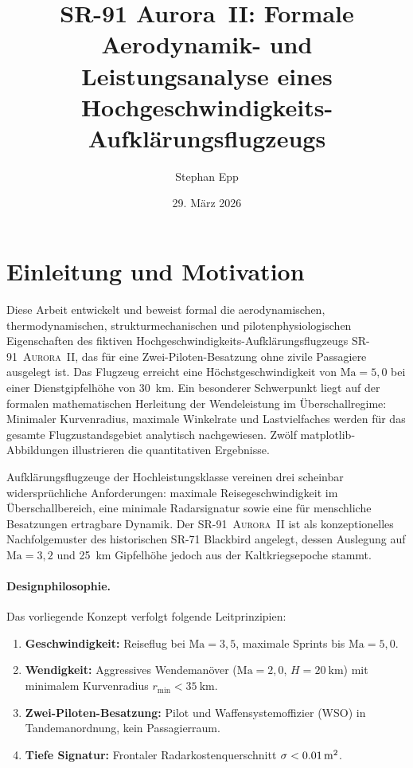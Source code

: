 ﻿\documentclass[12pt,a4paper]{article}
\title{\textbf{SR-91 Aurora~II:	Formale Aerodynamik- und Leistungsanalyse
	eines Hochgeschwindigkeits-Aufklärungsflugzeugs}}
\author{Stephan Epp}
\date{29. März 2026}
\theoremstyle{plain}
\theoremstyle{definition}
\theoremstyle{remark}
\newcommand{\SR}{\textsc{SR-91~Aurora~II}}
\newcommand{\Mach}[1]{$\mathrm{Ma} = #1$}
\begin{document}
\maketitle
\tableofcontents
\newpage

\section{Einleitung und Motivation}

Diese Arbeit entwickelt und beweist formal die aerodynamischen, thermodynamischen,
strukturmechanischen und pilotenphysiologischen Eigenschaften des fiktiven
Hochgeschwin\-digkeits-Aufklärungsflugzeugs \SR{}, das für eine Zwei-Piloten-Besatzung
ohne zivile Passagiere ausgelegt ist.
Das Flugzeug erreicht eine Höchstgeschwindigkeit von \Mach{5{,}0} bei einer
Dienstgipfelhöhe von \SI{30}{\kilo\metre}.
Ein besonderer Schwerpunkt liegt auf der formalen mathematischen Herleitung der
Wendeleistung im Überschallregime:
Minimaler Kurvenradius, maximale Winkelrate und Lastvielfaches werden für das
gesamte Flugzustandsgebiet analytisch nachgewiesen.
Zwölf matplotlib-Abbildungen illustrieren die quantitativen Ergebnisse.

Aufklärungsflugzeuge der Hochleistungsklasse vereinen drei scheinbar widersprüchliche
Anforderungen: maximale Reisegeschwindigkeit im Überschallbereich, eine minimale
Radarsignatur sowie eine für menschliche Besatzungen ertragbare Dynamik.
Der \SR{} ist als konzeptionelles Nachfolgemuster des historischen SR-71 Blackbird
angelegt, dessen Auslegung auf \Mach{3{,}2} und \SI{25}{\kilo\metre} Gipfelhöhe
jedoch aus der Kaltkriegsepoche stammt.

\paragraph{Designphilosophie.}
Das vorliegende Konzept verfolgt folgende Leitprinzipien:
\begin{enumerate}[label=\roman*.]
  \item \textbf{Geschwindigkeit:} Reiseflug bei \Mach{3{,}5}, maximale Sprints bis \Mach{5{,}0}.
  \item \textbf{Wendigkeit:} Aggressives Wendemanöver (\Mach{2{,}0}, $H = \SI{20}{\kilo\metre}$)
        mit minimalem Kurvenradius $r_{\min} < \SI{35}{\kilo\metre}$.
  \item \textbf{Zwei-Piloten-Besatzung:} Pilot und Waffensystemoffizier (WSO) in
        Tandemanordnung, kein Passagierraum.
  \item \textbf{Tiefe Signatur:} Frontaler Radarkostenquerschnitt $\sigma < \SI{0{,}01}{\metre\squared}$.
\end{enumerate}
\end{document}
